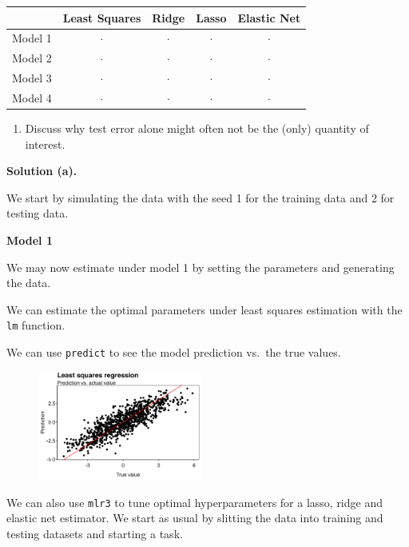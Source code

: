 \documentclass[a4paper,12pt,openany]{book}
\providecommand{\tightlist}{%
 \setlength{\itemsep}{0pt}\setlength{\parskip}{0pt}}
\begin{document}
\begin{longtable}[]{@{}lcccc@{}}
\toprule()
& Least Squares & Ridge & Lasso & Elastic Net \\
\midrule()
\endhead
Model 1 & \(\cdot\) & \(\cdot\) & \(\cdot\) & \(\cdot\) \\
Model 2 & \(\cdot\) & \(\cdot\) & \(\cdot\) & \(\cdot\) \\
Model 3 & \(\cdot\) & \(\cdot\) & \(\cdot\) & \(\cdot\) \\
Model 4 & \(\cdot\) & \(\cdot\) & \(\cdot\) & \(\cdot\) \\
\bottomrule()
\end{longtable}

\begin{enumerate}
\def\labelenumi{\alph{enumi}.}
\setcounter{enumi}{2}
\tightlist
\item
  Discuss why test error alone might often not be the (only) quantity of interest.
\end{enumerate}

\textbf{Solution (a).}

We start by simulating the data with the seed 1 for the training data and 2 for testing data.

\textbf{Model 1}

We may now estimate under model 1 by setting the parameters and generating the data.

We can estimate the optimal parameters under least squares estimation with the \texttt{lm} function.

We can use \texttt{predict} to see the model prediction vs.~the true values.

\begin{figure}[H]
  \begin{center}
    \includegraphics[width=0.48\textwidth]{figures/ML_week2_ex1_01.png}
  \end{center}
\end{figure}

We can also use \texttt{mlr3} to tune optimal hyperparameters for a lasso, ridge and elastic net estimator. We start as usual by slitting the data into training and testing datasets and starting a task.
\end{document}
